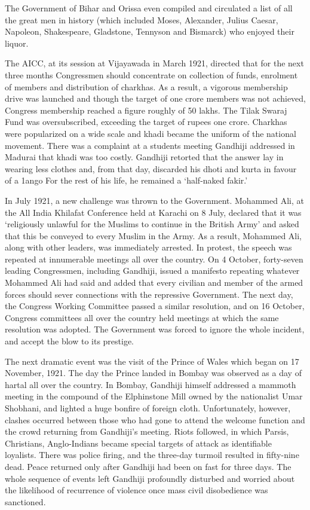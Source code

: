 The Government of Bihar and Orissa even compiled and circulated a list of all the great men in history (which included Moses, Alexander, Julius Caesar, Napoleon, Shakespeare, Gladstone, Tennyson and Bismarck) who enjoyed their liquor. 

The AICC, at its session at Vijayawada in March 1921, directed that for the next three months Congressmen should concentrate on collection of funds, enrolment of members and distribution of charkhas. As a result, a vigorous membership drive was launched and though the target of one crore members was not achieved, Congress membership reached a figure roughly of 50 lakhs. The Tilak Swaraj Fund was oversubscribed, exceeding the target of rupees one crore. Charkhas were popularized on a wide scale and khadi became the uniform of the national movement. There was a complaint at a students meeting Gandhiji addressed in Madurai that khadi was too costly. Gandhiji retorted that the answer lay in wearing less clothes and, from that day, discarded his dhoti and kurta in favour of a 1ango For the rest of his life, he remained a ‘half-naked fakir.’ 

In July 1921, a new challenge was thrown to the Government. Mohammed Ali, at the All India Khilafat Conference held at Karachi on 8 July, declared that it was ‘religiously unlawful for the Muslims to continue in the British Army’ and asked that this be conveyed to every Muslim in the Army. As a result, Mohammed Ali, along with other leaders, was immediately arrested. In protest, the speech was repeated at innumerable meetings all over the country. On 4 October, forty-seven leading Congressmen, including Gandhiji, issued a manifesto repeating whatever Mohammed Ali had said and added that every civilian and member of the armed forces should sever connections with the repressive Government. The next day, the Congress Working Committee passed a similar resolution, and on 16 October, Congress committees all over the country held meetings at which the same resolution was adopted. The Government was forced to ignore the whole incident, and accept the blow to its prestige. 

The next dramatic event was the visit of the Prince of Wales which began on 17 November, 1921. The day the Prince landed in Bombay was observed as a day of hartal all over the country. In Bombay, Gandhiji himself addressed a mammoth meeting in the compound of the Elphinstone Mill owned by the nationalist Umar Shobhani, and lighted a huge bonfire of foreign cloth. Unfortunately, however, clashes occurred between those who had gone to attend the welcome function and the crowd returning from Gandhiji’s meeting. Riots followed, in which Parsis, Christians, Anglo-Indians became special targets of attack as identifiable loyalists. There was police firing, and the three-day turmoil resulted in fifty-nine dead. Peace returned only after Gandhiji had been on fast for three days. The whole sequence of events left Gandhiji profoundly disturbed and worried about the likelihood of recurrence of violence once mass civil disobedience was sanctioned. 

